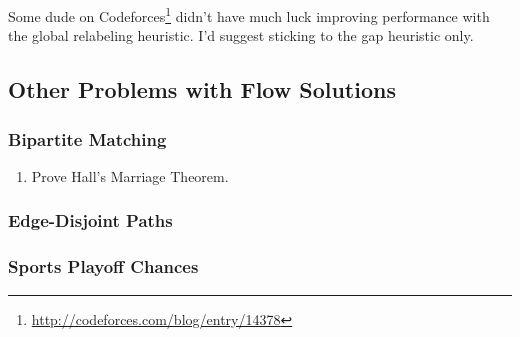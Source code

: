 Some dude on Codeforces\footnote{\url{http://codeforces.com/blog/entry/14378}} didn't have much luck improving performance with the global relabeling heuristic. I'd suggest sticking to the gap heuristic only.

\subsection{Other Problems with Flow Solutions}

\subsubsection{Bipartite Matching}

\begin{enumerate}

\item Prove Hall's Marriage Theorem.

\end{enumerate}

\subsubsection{Edge-Disjoint Paths}

\subsubsection{Sports Playoff Chances}

